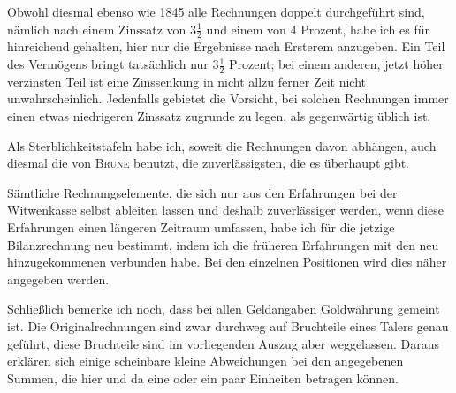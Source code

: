 Obwohl diesmal ebenso wie 1845 alle Rechnungen doppelt durchgeführt sind, nämlich nach einem Zinssatz von \(3\tfrac{1}{2}\) und einem von 4 Prozent, habe ich es für hinreichend gehalten, hier nur die Ergebnisse nach Ersterem anzugeben. Ein Teil des Vermögens bringt tatsächlich nur \(3\tfrac{1}{2}\) Prozent; bei einem anderen, jetzt höher verzinsten Teil ist eine Zinssenkung in nicht allzu ferner Zeit nicht unwahrscheinlich. Jedenfalls gebietet die Vorsicht, bei solchen Rechnungen immer einen etwas niedrigeren Zinssatz zugrunde zu legen, als gegenwärtig üblich ist.

Als Sterblichkeitstafeln habe ich, soweit die Rechnungen davon abhängen, auch diesmal die von \textsc{Brune} benutzt, die zuverlässigsten, die es überhaupt gibt.

Sämtliche Rechnungselemente, die sich nur aus den Erfahrungen bei der Witwenkasse selbst ableiten lassen und deshalb zuverlässiger werden, wenn diese Erfahrungen einen längeren Zeitraum umfassen, habe ich für die jetzige Bilanzrechnung neu bestimmt, indem ich die früheren Erfahrungen mit den neu hinzugekommenen verbunden habe. Bei den einzelnen Positionen wird dies näher angegeben werden.

Schließlich bemerke ich noch, dass bei allen Geldangaben Goldwährung gemeint ist. Die Originalrechnungen sind zwar durchweg auf Bruchteile eines Talers genau geführt, diese Bruchteile sind im vorliegenden Auszug aber weggelassen. Daraus erklären sich einige scheinbare kleine
Abweichungen bei den angegebenen Summen, die hier und da eine oder ein paar Einheiten betragen können.

